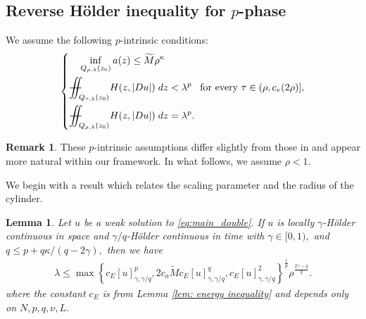 \documentclass[notitlepage,11pt,reqno]{amsart}
\newtheorem{lemma}[theorem]{Lemma}
\theoremstyle{definition}
\newtheorem{remark}[theorem]{Remark}
\numberwithin{equation}{section}
\newcommand{\iintss}{{\int\hspace{-0.28cm}\int}}
\newcommand{ \miints }{{\iintss\hspace{-0.56cm} -\hspace{-0.15cm}-}}
\newcommand{\miint}[1]{{\miints_{\hspace{-0.13cm}#1}}}
\begin{document}
\subsection{Reverse H\"{o}lder inequality for $p$-phase}  We assume the following $p$-intrinsic conditions:
\begin{equation}\label{eq: p-phase condition}
    \left\{
    \begin{aligned}
        &\quad \inf_{Q_{\rho, \lambda}(z_0)}a(z)\leq \widetilde M\rho^{\kappa}\\
        &\miint{Q_{\tau,\lambda}(z_0)} H(z,|Du|) \; dz <\lambda^p \ \, \text{ for every }\tau\in(\rho,c_v(2\rho)],\\
        &\miint{Q_{\rho,\lambda}(z_0)} H(z,|Du|) \; dz =\lambda^p.
    \end{aligned}
    \right.
\end{equation}
\begin{remark}
These $p$-intrinsic assumptions differ slightly from those in \cite{2023_Gradient_Higher_Integrability_for_Degenerate_Parabolic_Double-Phase_Systems} and appear more natural within our framework. In what follows, we assume $\rho<1.$
\end{remark}
We begin with a result which relates the scaling parameter and the radius of the cylinder. 
\begin{lemma} \label{lem: lambda rho relation}
Let $u$ be a weak solution to \eqref{eq:main_double}. If $u$ is  locally $\gamma$-H\"{o}lder continuous in space and $\gamma/q$-H\"older continuous in time with $\gamma \in [0, 1),$ and $q\leq p+q\kappa/(q-2\gamma),$ then we have 
\begin{align}\label{relation lambda rho}
    \lambda \leq \max\left\{c_E[u]^p_{\gamma,\gamma/q}, 2c_a\widetilde Mc_E[u]^q_{\gamma, \gamma/q}, c_E[u]^2_{\gamma, \gamma/q}\right\}^{\frac{1}{p}}\rho^{\frac{2\gamma-q}{q}}.
\end{align}
where the constant $c_E$ is from Lemma \ref{lem: energy inequality} and depends only on $N, p, q, \nu, L.$
\end{lemma}
\end{document}

